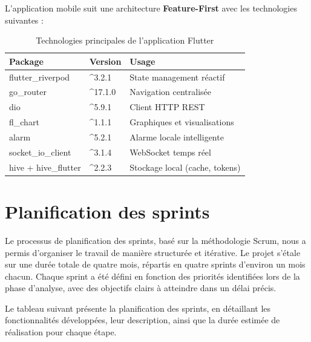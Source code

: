 \documentclass[12pt,a4paper]{report}
\begin{document}
L'application mobile suit une architecture \textbf{Feature-First} avec les technologies suivantes :

\begin{table}[H]
    \centering
    \caption{Technologies principales de l'application Flutter}
    \label{tab:flutter_stack}
    \renewcommand{\arraystretch}{1.3}
    \begin{tabular}{|l|l|p{6cm}|}
        \hline
        \textbf{Package} & \textbf{Version} & \textbf{Usage} \\
        \hline
        flutter\_riverpod & \^{}3.2.1 & State management réactif \\
        \hline
        go\_router & \^{}17.1.0 & Navigation centralisée \\
        \hline
        dio & \^{}5.9.1 & Client HTTP REST \\
        \hline
        fl\_chart & \^{}1.1.1 & Graphiques et visualisations \\
        \hline
        alarm & \^{}5.2.1 & Alarme locale intelligente \\
        \hline
        socket\_io\_client & \^{}3.1.4 & WebSocket temps réel \\
        \hline
        hive + hive\_flutter & \^{}2.2.3 & Stockage local (cache, tokens) \\
        \hline
    \end{tabular}
\end{table}

\section{Planification des sprints}

Le processus de planification des sprints, basé sur la méthodologie Scrum, nous a permis d'organiser le travail de manière structurée et itérative. Le projet s'étale sur une durée totale de quatre mois, répartis en quatre sprints d'environ un mois chacun. Chaque sprint a été défini en fonction des priorités identifiées lors de la phase d'analyse, avec des objectifs clairs à atteindre dans un délai précis.

Le tableau suivant présente la planification des sprints, en détaillant les fonctionnalités développées, leur description, ainsi que la durée estimée de réalisation pour chaque étape.
\end{document}
